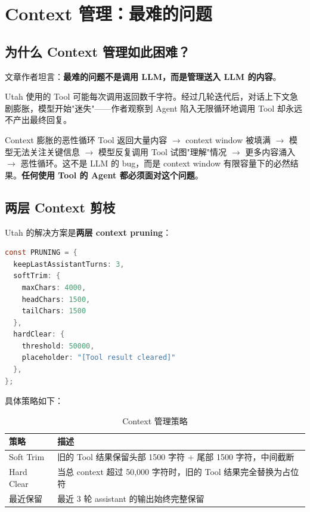 \section{Context 管理：最难的问题}

\subsection{为什么 Context 管理如此困难？}

文章作者坦言：\textbf{最难的问题不是调用 LLM，而是管理送入 LLM 的内容}。

Utah 使用的 Tool 可能每次调用返回数千字符。经过几轮迭代后，对话上下文急剧膨胀，模型开始"迷失"——作者观察到 Agent 陷入无限循环地调用 Tool 却永远不产出最终回复。

\begin{warningbox}{Context 膨胀的恶性循环}
Tool 返回大量内容 $\to$ context window 被填满 $\to$ 模型无法关注关键信息 $\to$ 模型反复调用 Tool 试图"理解"情况 $\to$ 更多内容涌入 $\to$ 恶性循环。这不是 LLM 的 bug，而是 context window 有限容量下的必然结果。\textbf{任何使用 Tool 的 Agent 都必须面对这个问题}。
\end{warningbox}

\subsection{两层 Context 剪枝}

Utah 的解决方案是\textbf{两层 context pruning}：

\begin{lstlisting}[caption={Context 剪枝配置},language=Java]
const PRUNING = {
  keepLastAssistantTurns: 3,
  softTrim: {
    maxChars: 4000,
    headChars: 1500,
    tailChars: 1500
  },
  hardClear: {
    threshold: 50000,
    placeholder: "[Tool result cleared]"
  },
};
\end{lstlisting}

具体策略如下：

\begin{table}[H]
\centering
\caption{Context 管理策略}
\begin{tabular}{lp{9cm}}
\toprule
\textbf{策略} & \textbf{描述} \\
\midrule
Soft Trim & 旧的 Tool 结果保留头部 1500 字符 + 尾部 1500 字符，中间截断 \\
Hard Clear & 当总 context 超过 50,000 字符时，旧的 Tool 结果完全替换为占位符 \\
最近保留 & 最近 3 轮 assistant 的输出始终完整保留 \\
\bottomrule
\end{tabular}
\end{table}

